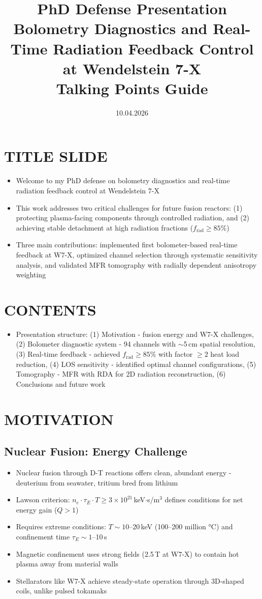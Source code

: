 \documentclass[11pt,a4paper]{article}
\title{\textbf{PhD Defense Presentation}\\[0.5em]
\Large Bolometry Diagnostics and Real-Time Radiation Feedback Control\\
at Wendelstein 7-X\\[1em]
\large Talking Points Guide}
\author{}
\date{10.04.2026}
\begin{document}
\section{TITLE SLIDE}

\begin{itemize}
\item Welcome to my PhD defense on bolometry diagnostics and real-time radiation feedback control at Wendelstein 7-X
\item This work addresses two critical challenges for future fusion reactors: (1) protecting plasma-facing components through controlled radiation, and (2) achieving stable detachment at high radiation fractions ($f_{\text{rad}}\geq85\%$)
\item Three main contributions: implemented first bolometer-based real-time feedback at W7-X, optimized channel selection through systematic sensitivity analysis, and validated MFR tomography with radially dependent anisotropy weighting
\end{itemize}

\section{CONTENTS}

\begin{itemize}
\item Presentation structure: (1) Motivation - fusion energy and W7-X challenges, (2) Bolometer diagnostic system - 94 channels with $\sim$5\,cm spatial resolution, (3) Real-time feedback - achieved $f_{\text{rad}}\geq85\%$ with factor $\geq2$ heat load reduction, (4) LOS sensitivity - identified optimal channel configurations, (5) Tomography - MFR with RDA for 2D radiation reconstruction, (6) Conclusions and future work
\end{itemize}

\section{MOTIVATION}

\subsection{Nuclear Fusion: Energy Challenge}

\begin{itemize}
\item Nuclear fusion through D-T reactions offers clean, abundant energy - deuterium from seawater, tritium bred from lithium
\item Lawson criterion: $n_e \cdot \tau_E \cdot T \geq 3\times10^{21}$\,keV$\cdot$s/m$^3$ defines conditions for net energy gain ($Q>1$)
\item Requires extreme conditions: $T\sim10$--20\,keV (100--200 million °C) and confinement time $\tau_E\sim1$--10\,s
\item Magnetic confinement uses strong fields (2.5\,T at W7-X) to contain hot plasma away from material walls
\item Stellarators like W7-X achieve steady-state operation through 3D-shaped coils, unlike pulsed tokamaks
\end{itemize}
\end{document}
